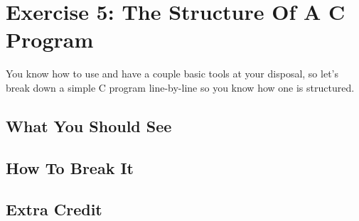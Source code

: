 \chapter{Exercise 5: The Structure Of A C Program}

You know how to use  and have a couple basic tools
at your disposal, so let's break down a simple C program line-by-line
so you know how one is structured.


\section{What You Should See}


\section{How To Break It}


\section{Extra Credit}



